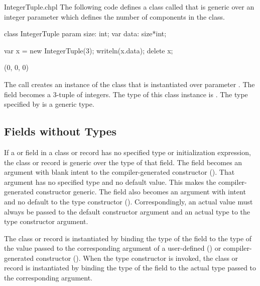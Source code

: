 \begin{chapelexample}{IntegerTuple.chpl}
The following code defines a class called  that is
generic over an integer parameter which defines the number of
components in the class.
\begin{chapel}
class IntegerTuple {
  param size: int;
  var data: size*int;
}
\end{chapel}
\begin{chapelpost}
var x = new IntegerTuple(3);
writeln(x.data);
delete x;
\end{chapelpost}
\begin{chapeloutput}
(0, 0, 0)
\end{chapeloutput}
The call  creates an instance of the
 class that is instantiated over parameter
.  The field  becomes a 3-tuple of integers.  The
type of this class instance is .  The type
specified by  is a generic type.
\end{chapelexample}

\subsection{Fields without Types}
\label{Fields_without_Types}

If a  or  field in a class or record has no specified type or
initialization expression, the class or record is generic over the
type of that field.  The field becomes an argument with blank intent to
the compiler-generated constructor ().
That argument has no specified type and no default
value. This makes the compiler-generated constructor generic.
The field also becomes an argument with  intent and no default
to the type constructor ().
Correspondingly, an actual value must always be passed to the default
constructor argument and an actual type to the type constructor argument.

The class or record is instantiated by binding the type of the field
to the type of the value passed to the corresponding argument
of a user-defined () or compiler-generated constructor ().
When the type constructor is invoked, the class or record is instantiated
by binding the type of the field to the actual type passed to
the corresponding argument.

